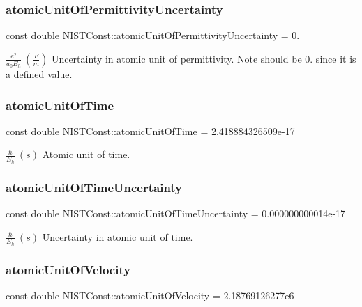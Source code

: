 \subsubsection{\texorpdfstring{atomic\+Unit\+Of\+Permittivity\+Uncertainty}{atomicUnitOfPermittivityUncertainty}}
{\footnotesize\ttfamily const double N\+I\+S\+T\+Const\+::atomic\+Unit\+Of\+Permittivity\+Uncertainty = 0.}

$\frac{e^2}{a_0 E_h} \ (\frac{F}{m})$ Uncertainty in atomic unit of permittivity. Note should be 0. since it is a defined value. \mbox{\label{group___atomic_unit_ga6181f64b8320afb6ecacc9c7f7e27afa}} 
\subsubsection{\texorpdfstring{atomic\+Unit\+Of\+Time}{atomicUnitOfTime}}
{\footnotesize\ttfamily const double N\+I\+S\+T\+Const\+::atomic\+Unit\+Of\+Time = 2.\+418884326509e-\/17}

$\frac{\hbar}{E_h} \ (s)$ Atomic unit of time. \mbox{\label{group___atomic_unit_ga18e7346fb75798ae9f339c99b3852950}} 
\subsubsection{\texorpdfstring{atomic\+Unit\+Of\+Time\+Uncertainty}{atomicUnitOfTimeUncertainty}}
{\footnotesize\ttfamily const double N\+I\+S\+T\+Const\+::atomic\+Unit\+Of\+Time\+Uncertainty = 0.\+000000000014e-\/17}

$\frac{\hbar}{E_h} \ (s)$ Uncertainty in atomic unit of time. \mbox{\label{group___atomic_unit_gaf22e630a5412176c4d94dbc8b1e36f70}} 
\subsubsection{\texorpdfstring{atomic\+Unit\+Of\+Velocity}{atomicUnitOfVelocity}}
{\footnotesize\ttfamily const double N\+I\+S\+T\+Const\+::atomic\+Unit\+Of\+Velocity = 2.\+18769126277e6}

